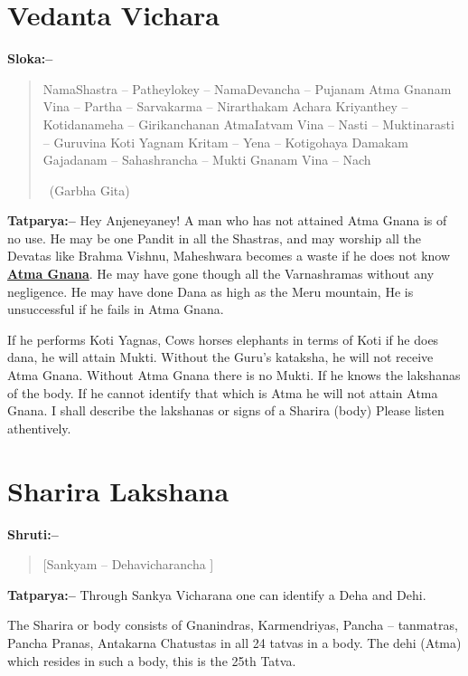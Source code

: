 \chapter{Vedanta Vichara}

\textbf{Sloka:–}

\begin{verse}
NamaShastra – Patheylokey – NamaDevancha – Pujanam  Atma Gnanam Vina – Partha – Sarvakarma – Nirarthakam Achara Kriyanthey – Kotidanameha – Girikanchanan  AtmaIatvam Vina – Nasti – Muktinarasti – Guruvina  Koti Yagnam Kritam – Yena – Kotigohaya Damakam  Gajadanam – Sahashrancha – Mukti Gnanam Vina – Nach  

~\hfill (Garbha Gita)
\end{verse}

\textbf{Tatparya:–} Hey Anjeneyaney! A man who has not attained Atma Gnana is of no use. He may be one Pandit in all the Shastras, and may worship all the Devatas like Brahma Vishnu, Maheshwara becomes a waste if he does not know \underline{\textbf{Atma Gnana}}. He may have gone though all the Varnashramas without any negligence. He may have done Dana as high as the Meru mountain, He is unsuccessful if he fails in Atma Gnana.

If he performs Koti Yagnas, Cows horses elephants in terms of Koti if he does dana, he will attain Mukti. Without the Guru's kataksha, he will not receive Atma Gnana. Without Atma Gnana there is no Mukti. If he knows the lakshanas of the body. If he cannot identify that which is Atma he will not attain Atma Gnana. I shall describe the lakshanas or signs of a Sharira (body) Please listen athentively.

\chapter{Sharira Lakshana}

\textbf{Shruti:–}

\begin{verse}
[Sankyam – Dehavicharancha ]
\end{verse}

\textbf{Tatparya:–} Through Sankya Vicharana one can identify a Deha and Dehi.

The Sharira or body consists of Gnanindras, Karmendriyas, Pancha – tanmatras, Pancha Pranas, Antakarna Chatustas in all 24 tatvas in a body. The dehi (Atma) which resides in such a body, this is the 25th Tatva.

